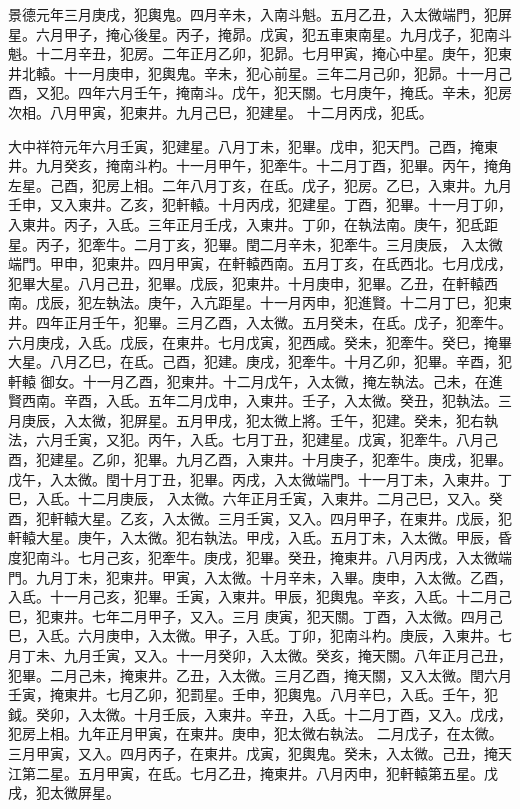 \begin{pinyinscope}
 景德元年三月庚戌，犯輿鬼。四月辛未，入南斗魁。五月乙丑，入太微端門，犯屏星。六月甲子，掩心後星。丙子，掩昴。戊寅，犯五車東南星。九月戊子，犯南斗魁。十二月辛丑，犯房。二年正月乙卯，犯昴。七月甲寅，掩心中星。庚午，犯東井北轅。十一月庚申，犯輿鬼。辛未，犯心前星。三年二月己卯，犯昴。十一月己酉，又犯。四年六月壬午，掩南斗。戊午，犯天關。七月庚午，掩氐。辛未，犯房次相。八月甲寅，犯東井。九月己巳，犯建星。
 十二月丙戌，犯氐。



 大中祥符元年六月壬寅，犯建星。八月丁未，犯畢。戊申，犯天門。己酉，掩東井。九月癸亥，掩南斗杓。十一月甲午，犯牽牛。十二月丁酉，犯畢。丙午，掩角左星。己酉，犯房上相。二年八月丁亥，在氐。戊子，犯房。乙巳，入東井。九月壬申，又入東井。乙亥，犯軒轅。十月丙戌，犯建星。丁酉，犯畢。十一月丁卯，入東井。丙子，入氐。三年正月壬戌，入東井。丁卯，在執法南。庚午，犯氐距星。丙子，犯牽牛。二月丁亥，犯畢。閏二月辛未，犯牽牛。三月庚辰，
 入太微端門。甲申，犯東井。四月甲寅，在軒轅西南。五月丁亥，在氐西北。七月戊戌，犯畢大星。八月己丑，犯畢。戊辰，犯東井。十月庚申，犯畢。乙丑，在軒轅西南。戊辰，犯左執法。庚午，入亢距星。十一月丙申，犯進賢。十二月丁巳，犯東井。四年正月壬午，犯畢。三月乙酉，入太微。五月癸未，在氐。戊子，犯牽牛。六月庚戌，入氐。戊辰，在東井。七月戊寅，犯西咸。癸未，犯牽牛。癸巳，掩畢大星。八月乙巳，在氐。己酉，犯建。庚戌，犯牽牛。十月乙卯，犯畢。辛酉，犯軒轅
 御女。十一月乙酉，犯東井。十二月戊午，入太微，掩左執法。己未，在進賢西南。辛酉，入氐。五年二月戊申，入東井。壬子，入太微。癸丑，犯執法。三月庚辰，入太微，犯屏星。五月甲戌，犯太微上將。壬午，犯建。癸未，犯右執法，六月壬寅，又犯。丙午，入氐。七月丁丑，犯建星。戊寅，犯牽牛。八月己酉，犯建星。乙卯，犯畢。九月乙酉，入東井。十月庚子，犯牽牛。庚戌，犯畢。戊午，入太微。閏十月丁丑，犯畢。丙戌，入太微端門。十一月丁未，入東井。丁巳，入氐。十二月庚辰，
 入太微。六年正月壬寅，入東井。二月己巳，又入。癸酉，犯軒轅大星。乙亥，入太微。三月壬寅，又入。四月甲子，在東井。戊辰，犯軒轅大星。庚午，入太微。犯右執法。甲戌，入氐。五月丁未，入太微。甲辰，昏度犯南斗。七月己亥，犯牽牛。庚戌，犯畢。癸丑，掩東井。八月丙戌，入太微端門。九月丁未，犯東井。甲寅，入太微。十月辛未，入畢。庚申，入太微。乙酉，入氐。十一月己亥，犯畢。壬寅，入東井。甲辰，犯輿鬼。辛亥，入氐。十二月己巳，犯東井。七年二月甲子，又入。三月
 庚寅，犯天關。丁酉，入太微。四月己巳，入氐。六月庚申，入太微。甲子，入氐。丁卯，犯南斗杓。庚辰，入東井。七月丁未、九月壬寅，又入。十一月癸卯，入太微。癸亥，掩天關。八年正月己丑，犯畢。二月己未，掩東井。乙丑，入太微。三月乙酉，掩天關，又入太微。閏六月壬寅，掩東井。七月乙卯，犯罰星。壬申，犯輿鬼。八月辛巳，入氐。壬午，犯鉞。癸卯，入太微。十月壬辰，入東井。辛丑，入氐。十二月丁酉，又入。戊戌，犯房上相。九年正月甲寅，在東井。庚申，犯太微右執法。
 二月戊子，在太微。三月甲寅，又入。四月丙子，在東井。戊寅，犯輿鬼。癸未，入太微。己丑，掩天江第二星。五月甲寅，在氐。七月乙丑，掩東井。八月丙申，犯軒轅第五星。戊戌，犯太微屏星。




\end{pinyinscope}

